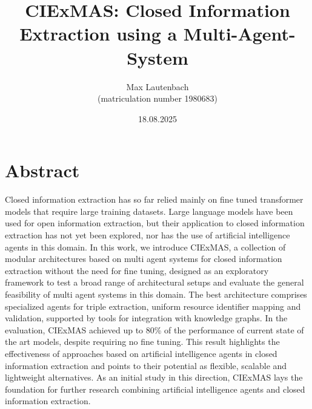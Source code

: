 \documentclass[a4paper,oneside,bibliography=totoc]{scrbook}
\begin{document}
\frontmatter
\subject{Master Thesis}
\title{CIExMAS: Closed Information Extraction using a Multi-Agent-System}
\author{Max Lautenbach\\
  (matriculation number 1980683)}
\date{18.08.2025}
\publishers{{\small Submitted to}\\
  Data and Web Science Group\\
  Dr.\ Sven Hertling\\
  University of Mannheim\\}
\maketitle

\chapter{Abstract}
Closed information extraction has so far relied mainly on fine tuned transformer models that require large training datasets. Large language models have been used for open information extraction, but their application to closed information extraction has not yet been explored, nor has the use of artificial intelligence agents in this domain. In this work, we introduce CIExMAS, a collection of modular architectures based on multi agent systems for closed information extraction without the need for fine tuning, designed as an exploratory framework to test a broad range of architectural setups and evaluate the general feasibility of multi agent systems in this domain. The best architecture comprises specialized agents for triple extraction, uniform resource identifier mapping and validation, supported by tools for integration with knowledge graphs. In the evaluation, CIExMAS achieved up to 80\% of the performance of current state of the art models, despite requiring no fine tuning. This result highlights the effectiveness of approaches based on artificial intelligence agents in closed information extraction and points to their potential as flexible, scalable and lightweight alternatives. As an initial study in this direction, CIExMAS lays the foundation for further research combining artificial intelligence agents and closed information extraction.

\begingroup%
\hypersetup{hidelinks}%
\tableofcontents%
\endgroup

\begingroup%
\hypersetup{hidelinks}%
\listoffigures%
\endgroup

\begingroup%
\hypersetup{hidelinks}%
\listoftables%
\endgroup
\end{document}
